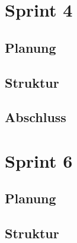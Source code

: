 \documentclass{my_Presentation}
\begin{document}
\section{Sprint 4}
\subsection*{Planung}

\subsection*{Struktur}

\subsection*{Abschluss}



%
%


\section{Sprint 6}
\subsection*{Planung}

\subsection*{Struktur}


\end{document}

